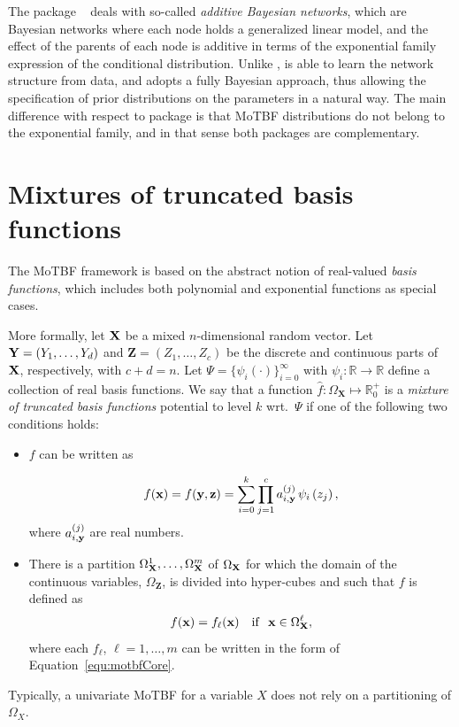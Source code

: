 The package  ~\citep{Kra19} deals with so-called \emph{additive Bayesian networks}, which are
Bayesian networks where each node holds a generalized linear model, and the effect of the parents of each node is
additive in terms of the exponential family expression of the conditional distribution. Unlike ,
 is able to learn the network structure from data, and adopts a fully Bayesian approach, thus allowing the
specification of prior distributions on the parameters in a natural way. The main difference with respect to
package  is that MoTBF distributions do not belong to the exponential family, and in that sense both
packages are complementary. 


\section{Mixtures of truncated basis functions}\label{sec:motbf}

The MoTBF framework \citep{Lan12} is based on the abstract notion of real-valued \emph{basis functions}, 
which includes both polynomial and exponential functions as special cases.

More formally, let $\mathbf{X}$ be a mixed $n$-dimensional random vector. Let $\mathbf{Y}
= (Y_1,\ldots,Y_d)$ and $\mathbf{Z} = (Z_1,\ldots,Z_c)$ be the
discrete and continuous parts of $\mathbf{X}$, respectively, with $c
+ d = n$.  Let $\Psi=\{\psi_i(\cdot)\}_{i=0}^{\infty}$ with
$\psi_i:\mathbb{R}\to \mathbb{R}$ define a collection of real basis functions. We say that a function $\hat f:\Omega_{\mathbf{X}}\mapsto
\mathbb{R}_0^+$ is a \emph{mixture of truncated basis functions}\/ potential to level $k$ wrt.\ $\Psi$ 
if  one of the following two conditions holds:

\begin{itemize}
	\item $f$ can be written as
      
	\begin{equation}\label{equ:motbfCore}
	f(\mathbf{x}) = f(\mathbf{y},\mathbf{z}) =  \sum_{i=0}^k     \prod_{j=1}^c a_{i,\mathbf{y}}^{(j)}\, \psi_i\left( z_j \right), 
	\end{equation}
	where $a_{i,\mathbf{y}}^{(j)}$ are real numbers. 

	\item There is a partition $\Omega_{\mathbf{X}}^1,\ldots,\Omega_{\mathbf{X}}^m$ of $\Omega_{\mathbf{X}}$ for which   the domain of the continuous variables, $\Omega_{\mathbf{Z}}$, is
	divided into hyper-cubes and such that $f$ is defined as
	$$
	f(\mathbf{x}) = f_\ell(\mathbf{x}) \quad \mathrm{if}~~ \mathbf{x} \in \Omega_{\mathbf{X}}^\ell,
	$$
	\noindent
	where each $f_\ell$, $\ell=1,\ldots,m$ can be written in the
	form of Equation~\ref{equ:motbfCore}.
\end{itemize}
Typically, a univariate MoTBF for a variable $X$ does not rely on a partitioning of $\Omega_X$. 

